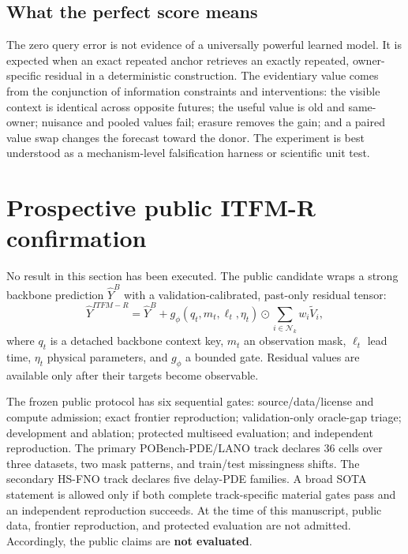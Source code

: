 \documentclass[11pt]{article}
\newcommand{\publicmethod}{ITFM-R}
\begin{document}
\subsection{What the perfect score means}

The zero query error is not evidence of a universally powerful learned model.
It is expected when an exact repeated anchor retrieves an exactly repeated,
owner-specific residual in a deterministic construction. The evidentiary value
comes from the conjunction of information constraints and interventions: the
visible context is identical across opposite futures; the useful value is old
and same-owner; nuisance and pooled values fail; erasure removes the gain; and a
paired value swap changes the forecast toward the donor. The experiment is
best understood as a mechanism-level falsification harness or scientific unit
test.

\section{Prospective public \publicmethod{} confirmation}

No result in this section has been executed. The public candidate wraps a
strong backbone prediction $\widehat{Y}^{B}$ with a validation-calibrated,
past-only residual tensor:
\begin{equation}
 \widehat{Y}^{\publicmethod}=\widehat{Y}^{B}
 +g_\phi(q_t,m_t,\ell_t,\eta_t)\odot
 \sum_{i\in\mathcal{N}_k}w_i\widetilde{V}_i,
\end{equation}
where $q_t$ is a detached backbone context key, $m_t$ an observation mask,
$\ell_t$ lead time, $\eta_t$ physical parameters, and $g_\phi$ a bounded gate.
Residual values are available only after their targets become observable.

The frozen public protocol has six sequential gates: source/data/license and
compute admission; exact frontier reproduction; validation-only oracle-gap
triage; development and ablation; protected multiseed evaluation; and
independent reproduction. The primary POBench-PDE/LANO track declares 36 cells
over three datasets, two mask patterns, and train/test missingness shifts. The
secondary HS-FNO track declares five delay-PDE families. A broad SOTA statement
is allowed only if both complete track-specific material gates pass and an
independent reproduction succeeds. At the time of this manuscript, public data,
frontier reproduction, and protected evaluation are not admitted. Accordingly,
the public claims are \textbf{not evaluated}.
\end{document}
